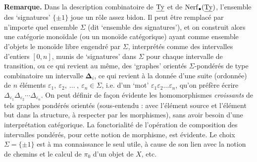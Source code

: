 \textbf{Remarque.} Dans la description combinatoire de $\underline{\mathrm{Ty}}$ et de $\mathrm{Nerf}_\bullet(\underline{\mathrm{Ty}})$, l'ensemble des `signatures' $\{\pm1\}$ joue un rôle assez bidon. Il peut être remplacé par n'importe quel ensemble $\Sigma$ (dit `ensemble des signatures'), et on construit alors une catégorie monoïdale (ou un monoïde catégorique) ayant comme ensemble d'objets le monoïde libre engendré par $\Sigma$, interprétés comme des intervalles d'entiers $[0,n]$, munis de `signatures' dans $\Sigma$ pour chaque intervalle de transition, ou ce qui revient au même, des `graphes' orientés $\Sigma$-pondérés de type combinatoire un intervalle $\boldsymbol{\Delta}_i$, ce qui revient à la donnée d'une suite (ordonnée) de $n$ éléments $\varepsilon_1,\ \varepsilon_2,\ \ldots\ ,\ \varepsilon_n \in \Sigma$, i.e. d'un `mot' $\varepsilon_1\varepsilon_2\ldots\varepsilon_n$, qu'on préfère écrire $\Delta_{\varepsilon_1}\Delta_{\varepsilon_2}\cdots\Delta_{\varepsilon_n}$. On peut définir de façon évidente les homomorphismes \textit{croissants} de tels graphes pondérés orientés (sous-entendu : avec l'élément source et l'élément but dans la structure, à respecter par les morphismes), sans avoir besoin d'une interprétation catégorique. La fonctorialité de l'opération de composition des intervalles pondérés, pour cette notion de morphisme, est évidente. Le
choix $\Sigma = \{\pm1\}$ est à ma connaissance le seul utile, à cause de son lien avec la notion de chemins et le calcul de $\pi_0$ d'un objet de $X$, etc.

